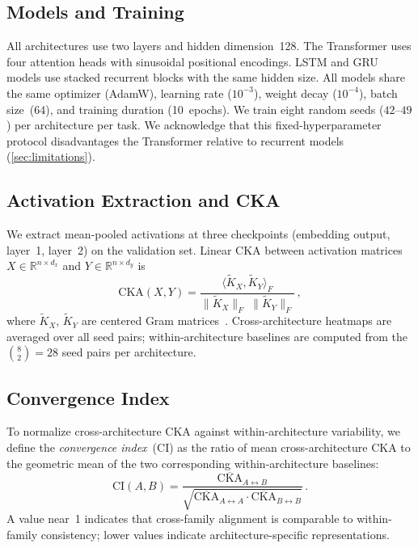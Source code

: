 \documentclass{article}
\newcommand{\cka}{\mathrm{CKA}}
\begin{document}
\subsection{Models and Training}

All architectures use two layers and hidden dimension~128. The 
Transformer uses four attention heads with sinusoidal positional 
encodings. LSTM and GRU models use stacked recurrent blocks with 
the same hidden size. All models share the same optimizer 
(AdamW), learning rate ($10^{-3}$), weight decay ($10^{-4}$), 
batch size~(64), and training duration (10~epochs). We train 
eight random seeds ($42$--$49$) per architecture per task. We 
acknowledge that this fixed-hyperparameter protocol 
disadvantages the Transformer relative to recurrent models 
(\cref{sec:limitations}).

\subsection{Activation Extraction and CKA}

We extract mean-pooled activations at three checkpoints 
(embedding output, layer~1, layer~2) on the validation set. 
Linear CKA between activation matrices 
$X \in \mathbb{R}^{n \times d_x}$ and 
$Y \in \mathbb{R}^{n \times d_y}$ is
\begin{equation}
\cka(X,Y) = \frac{\langle \widetilde{K}_X, \widetilde{K}_Y 
\rangle_F}{\|\widetilde{K}_X\|_F\;\|\widetilde{K}_Y\|_F}\,,
\label{eq:cka}
\end{equation}
where $\widetilde{K}_X$, $\widetilde{K}_Y$ are centered Gram 
matrices~\citep{kornblith2019similarity}. Cross-architecture 
heatmaps are averaged over all seed pairs; within-architecture 
baselines are computed from the $\binom{8}{2}=28$ seed pairs per 
architecture.

\subsection{Convergence Index}

To normalize cross-architecture CKA against 
within-architecture variability, we define the 
\emph{convergence index}~(CI) as the ratio of mean 
cross-architecture CKA to the geometric mean of the two 
corresponding within-architecture baselines:
\begin{equation}
\mathrm{CI}(A,B) = \frac{\overline{\cka}_{A \leftrightarrow B}}
{\sqrt{\overline{\cka}_{A \leftrightarrow A} \cdot
\overline{\cka}_{B \leftrightarrow B}}}\,.
\label{eq:ci}
\end{equation}
A value near~1 indicates that cross-family alignment is 
comparable to within-family consistency; lower values indicate 
architecture-specific representations.
\end{document}
